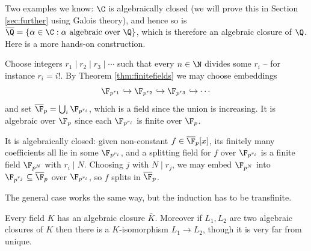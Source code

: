 Two examples we know: $\C$ is algebraically closed (we will prove this in Section \ref{sec:further} using Galois theory), and hence so is $\overline\Q = \{\alpha \in \C : \alpha \text{ algebraic over } \Q\}$, which is therefore an algebraic closure of $\Q$. Here is a more hands-on construction.

\begin{example}
	Choose integers $r_1 \mid r_2 \mid r_3 \mid \cdots$ such that every $n \in \N$ divides some $r_i$ -- for instance $r_i = i!$. By Theorem \ref{thm:finitefields} we may choose embeddings
	$$\F_{p^{r_1}} \hookrightarrow \F_{p^{r_2}} \hookrightarrow \F_{p^{r_3}} \hookrightarrow \cdots$$
	and set $\overline{\F}_p = \bigcup_i \F_{p^{r_i}}$, which is a field since the union is increasing. It is algebraic over $\F_p$ since each $\F_{p^{r_i}}$ is finite over $\F_p$.

	It is algebraically closed: given non-constant $f \in \overline\F_p[x]$, its finitely many coefficients all lie in some $\F_{p^{r_i}}$, and a splitting field for $f$ over $\F_{p^{r_i}}$ is a finite field $\F_{p^N}$ with $r_i \mid N$. Choosing $j$ with $N \mid r_j$, we may embed $\F_{p^N}$ into $\F_{p^{r_j}} \subseteq \overline\F_p$ over $\F_{p^{r_i}}$, so $f$ splits in $\overline\F_p$.
\end{example}

The general case works the same way, but the induction has to be transfinite.

\begin{theorem}
	Every field $K$ has an algebraic closure $\overline K$. Moreover if $L_1, L_2$ are two algebraic closures of $K$ then there is a $K$-isomorphism $L_1 \to L_2$, though it is very far from unique.
\end{theorem}


